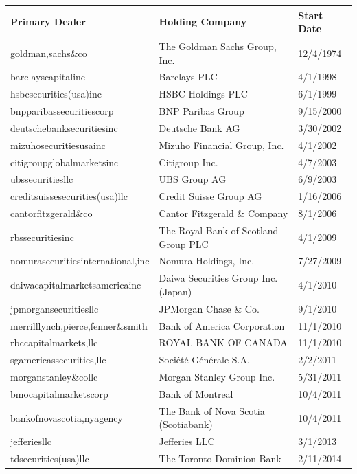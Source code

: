 \documentclass{article}
\begin{document}
\par

\begin{tabular}{lll}
\toprule
Primary Dealer & Holding Company & Start Date \\
\midrule
goldman,sachs\&co & The Goldman Sachs Group, Inc. & 12/4/1974 \\
barclayscapitalinc & Barclays PLC & 4/1/1998 \\
hsbcsecurities(usa)inc & HSBC Holdings PLC & 6/1/1999 \\
bnpparibassecuritiescorp & BNP Paribas Group & 9/15/2000 \\
deutschebanksecuritiesinc & Deutsche Bank AG & 3/30/2002 \\
mizuhosecuritiesusainc & Mizuho Financial Group, Inc. & 4/1/2002 \\
citigroupglobalmarketsinc & Citigroup Inc. & 4/7/2003 \\
ubssecuritiesllc & UBS Group AG & 6/9/2003 \\
creditsuissesecurities(usa)llc & Credit Suisse Group AG & 1/16/2006 \\
cantorfitzgerald\&co & Cantor Fitzgerald \& Company & 8/1/2006 \\
rbssecuritiesinc & The Royal Bank of Scotland Group PLC & 4/1/2009 \\
nomurasecuritiesinternational,inc & Nomura Holdings, Inc. & 7/27/2009 \\
daiwacapitalmarketsamericainc & Daiwa Securities Group Inc. (Japan) & 4/1/2010 \\
jpmorgansecuritiesllc & JPMorgan Chase \& Co. & 9/1/2010 \\
merrilllynch,pierce,fenner\&smith & Bank of America Corporation & 11/1/2010 \\
rbccapitalmarkets,llc & ROYAL BANK OF CANADA & 11/1/2010 \\
sgamericassecurities,llc & Société Générale S.A. & 2/2/2011 \\
morganstanley\&collc & Morgan Stanley Group Inc. & 5/31/2011 \\
bmocapitalmarketscorp & Bank of Montreal & 10/4/2011 \\
bankofnovascotia,nyagency & The Bank of Nova Scotia (Scotiabank) & 10/4/2011 \\
jefferiesllc & Jefferies LLC & 3/1/2013 \\
tdsecurities(usa)llc & The Toronto-Dominion Bank & 2/11/2014 \\
\bottomrule
\end{tabular}
\end{document}
